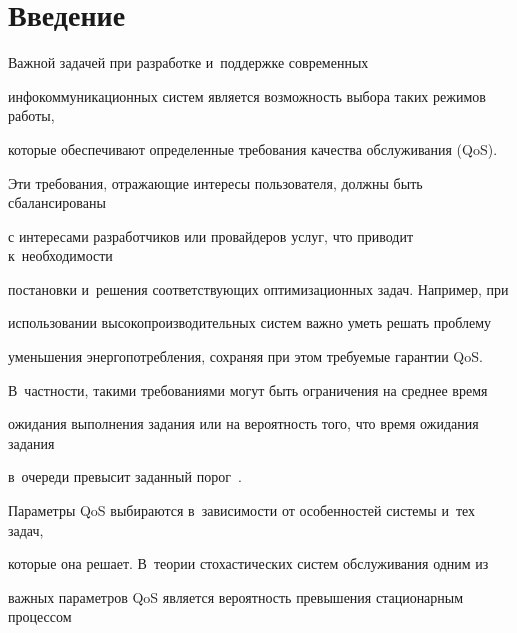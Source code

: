 







      \thispagestyle{headings}


      







\section{Введение}





Важной задачей при разработке и~поддержке современных 


инфокоммуникационных  систем является возможность  выбора таких режимов работы, 


которые  обеспечивают   определенные  требования  качества обслуживания (QoS).





Эти требования, отражающие  интересы пользователя,  должны быть сбалансированы


с интересами разработчиков или провайдеров услуг, что приводит к~необходимости 


постановки и~решения соответствующих оптимизационных задач.  Например, при 


использовании высокопроизводительных систем важно  уметь решать проблему  


уменьшения энергопотребления, сохраняя при этом требуемые  гарантии QoS.


В~частности, такими требованиями могут быть  ограничения на среднее время 


ожидания выполнения задания или на вероятность того, что  время ожидания задания  


в~очереди превысит  заданный порог~\cite{London}.





Параметры  QoS  выбираются в~зависимости от особенностей системы и~тех задач, 


которые она решает. В~теории стохастических систем обслуживания одним из


важных  параметров QoS  является вероятность превышения стационарным процессом 



